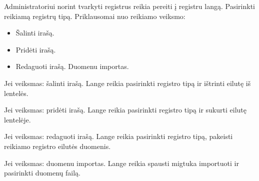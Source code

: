 	Administratoriui norint tvarkyti registrus reikia pereiti į registru langą. Pasirinkti reikiamą registrų tipą. 
	Priklausomai nuo reikiamo veiksmo:
	
	\begin{itemize}
		\item Šalinti irašą.
		\item Pridėti irašą.
		\item Redaguoti irašą.
		\itrm Duomenu importas.
	\end{itemize}
	
	
	Jei veiksmas: šalinti irašą. Lange  reikia pasirinkti registro tipą ir ištrinti eilutę iš lentelės.

	Jei veiksmas: pridėti irašą. Lange  reikia pasirinkti registro tipą ir sukurti eilutę lentelėje.

	Jei veiksmas: redaguoti irašą. Lange  reikia pasirinkti registro tipą, pakeisti reikiamo registro eilutės duomenis.

	Jei veiksmas: duomenu importas. Lange  reikia spausti migtuka importuoti ir pasirinkti duomenų failą.